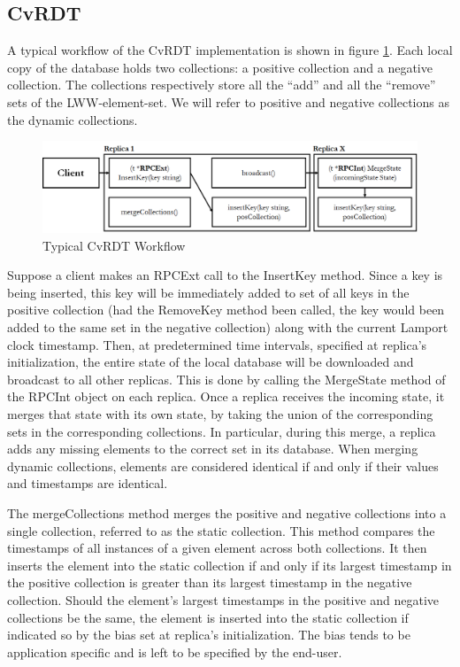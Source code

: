 \documentclass[sigconf,nonacm,10pt]{acmart}
\begin{document}
\subsection{CvRDT}
A typical workflow of the CvRDT implementation is shown in figure \ref{fig:cvrdt1}. Each local copy of the database holds two collections: a positive collection and a negative collection. The collections respectively store all the ``add'' and all the ``remove'' sets of the LWW-element-set. We will refer to positive and negative collections as the dynamic collections. 

\begin{figure}[h]
  \centering
  \includegraphics[width=15cm]{Fig2CvRDT1}
  \caption{Typical CvRDT Workflow}
  \label{fig:cvrdt1}
\end{figure}

Suppose a client makes an RPCExt call to the InsertKey method. Since a key is being inserted, this key will be immediately added to set of all keys in the positive collection (had the RemoveKey method been called, the key would been added to the same set in the negative collection) along with the current Lamport clock timestamp. Then, at predetermined time intervals, specified at replica's initialization, the entire state of the local database will be downloaded and broadcast to all other replicas. This is done by calling the MergeState method of the RPCInt object on each replica. Once a replica receives the incoming state, it merges that state with its own state, by taking the union of the corresponding sets in the corresponding collections. In particular, during this merge, a replica adds any missing elements to the correct set in its database. When merging dynamic collections, elements are considered identical if and only if their values and timestamps are identical.

The mergeCollections method merges the positive and negative collections into a single collection, referred to as the static collection. This method compares the timestamps of all instances of a given element across both collections. It then inserts the element into the static collection if and only if its largest timestamp in the positive collection is greater than its largest timestamp in the negative collection. Should the element's largest timestamps in the positive and negative collections be the same, the element is inserted into the static collection if indicated so by the bias set at replica's initialization. The bias tends to be application specific and is left to be specified by the end-user.
\end{document}
